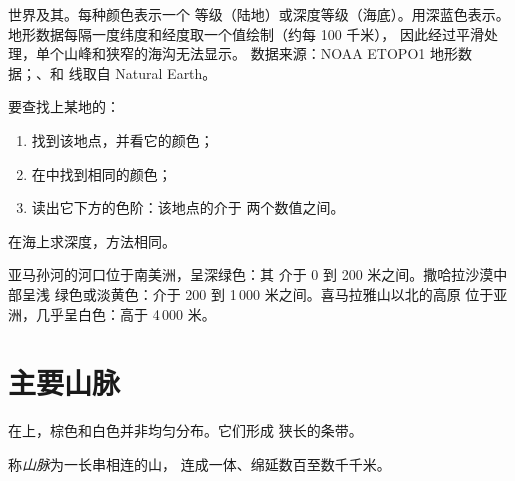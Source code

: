 \begin{omfigure}
{\small 世界及其。每种颜色表示一个
等级（陆地）或深度等级（海底）。用深蓝色表示。
地形数据每隔一度纬度和经度取一个值绘制（约每 100 千米），
因此经过平滑处理，单个山峰和狭窄的海沟无法显示。
数据来源：NOAA ETOPO1 地形数据；、和
线取自 Natural Earth。}
\label{fig:g4:world-physical-map:map}
\end{omfigure}

\begin{method}[读取自然地图上的颜色]\label{met:g4:world-physical-map:reading}
要查找上某地的：
\begin{enumerate}
  \item 找到该地点，并看它的颜色；
  \item 在中找到相同的颜色；
  \item 读出它下方的色阶：该地点的介于
        两个数值之间。
\end{enumerate}
在海上求深度，方法相同。
\end{method}

\begin{example}[三处地点]\label{ex:g4:world-physical-map:three}
亚马孙河的河口位于南美洲，呈深绿色：其
介于 0 到 200 米之间。撒哈拉沙漠中部呈浅
绿色或淡黄色：介于 200 到 1\,000 米之间。喜马拉雅山以北的高原
位于亚洲，几乎呈白色：高于 4\,000 米。
\end{example}

\section{主要山脉}

在上，棕色和白色并非均匀分布。它们形成
狭长的条带。

\begin{definition}[山脉]\label{def:g4:world-physical-map:range}
称\emph{山脉}为一长串相连的山，
连成一体、绵延数百至数千千米。
\end{definition}

